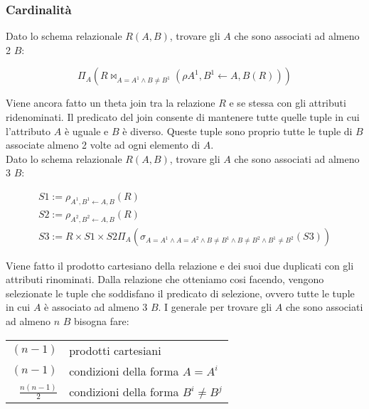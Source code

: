 \subsubsection{Cardinalità}

Dato lo schema relazionale $R(A,B)$, trovare gli $A$ che sono associati ad almeno 2 $B$:

\begin{displaymath}
  \Pi_{A}(R \bowtie_{A=A^1 \land B \neq B^1}(\rho{A^1,B^1 \leftarrow A,B}(R)))
\end{displaymath}

Viene ancora fatto un theta join tra la relazione $R$ e se stessa con gli attributi
ridenominati. Il predicato del join consente di mantenere tutte quelle tuple in cui
l'attributo $A$ è uguale e $B$ è diverso. Queste tuple sono proprio tutte le tuple di $B$
associate almeno 2 volte ad ogni elemento di $A$. \\

\noindent
Dato lo schema relazionale $R(A,B)$, trovare gli $A$ che sono associati ad almeno 3 $B$:

\begin{gather*}
  S1 := \rho_{A^1,B^1 \leftarrow A,B}(R) \\
  S2 := \rho_{A^2,B^2 \leftarrow A,B}(R) \\
  S3 := R \times S1 \times S2
  \Pi_{A}(\sigma_{A=A^1 \land A=A^2 \land B \neq B^1 \land B \neq B^2 \land B^1 \neq B^2}(S3))
\end{gather*}

Viene fatto il prodotto cartesiano della relazione e dei suoi due duplicati con gli attributi
rinominati. Dalla relazione che otteniamo cosi facendo, vengono selezionate le tuple che
soddisfano il predicato di selezione, ovvero tutte le tuple in cui $A$ è associato ad almeno
3 $B$. I generale per trovare gli $A$ che sono associati ad almeno $n$ $B$ bisogna fare: \\
\begin{center}
  \begin{tabular}{|r|l|}
    \hline
    $(n-1)$ & prodotti cartesiani \\
    $(n-1)$ & condizioni della forma $A=A^i$ \\
    $\frac{n(n-1)}{2}$ & condizioni della forma $B^i \neq B^j$ \\
    \hline
  \end{tabular}
\end{center}